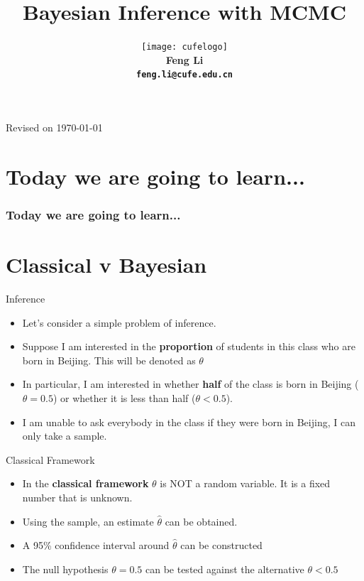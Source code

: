 \documentclass[10pt]{beamer}
\title[Statistical Computing]{{\textbf{Bayesian Inference with MCMC}}}
\author[Feng Li]{\texttt{[image: cufelogo]}\\
  \vspace{0.5cm}\textbf{Feng Li\\\texttt{feng.li@cufe.edu.cn}}}
\institute[SAM.CUFE.EDU.CN]{\footnotesize{\textbf{School of Statistics and Mathematics\\
      Central University of Finance and Economics}}}
\date{}
\begin{document}
\begin{frame}[plain]
  \titlepage
  \tiny{Revised on \today}
\end{frame}




\section*{Today we are going to learn...}
\begin{frame}
  \frametitle{Today we are going to learn...}
  \tableofcontents
\end{frame}



\section{Classical v Bayesian}
\begin{frame}{Inference}
  \begin{itemize}
  \item Let's consider a simple problem of inference.

  \item Suppose I am interested in the {\bf proportion} of students in this class who are born in Beijing.  This will be denoted as $\theta$

  \item In particular, I am interested in whether {\bf half} of the class is born in Beijing ($\theta=0.5$) or whether it is less than half ($\theta<0.5$).

  \item I am unable to ask everybody in the class if they were born in Beijing, I can only take a sample.
  \end{itemize}
\end{frame}
\begin{frame}{Classical Framework}
  \begin{itemize}
  \item In the {\bf classical framework} $\theta$ is NOT a random variable.  It is a fixed number that is unknown.

  \item Using the sample, an estimate $\hat{\theta}$ can be obtained.

  \item A 95\% confidence interval around $\hat{\theta}$ can be constructed

  \item The null hypothesis $\theta=0.5$ can be tested against the alternative $\theta< 0.5$
  \end{itemize}
\end{frame}
\end{document}
